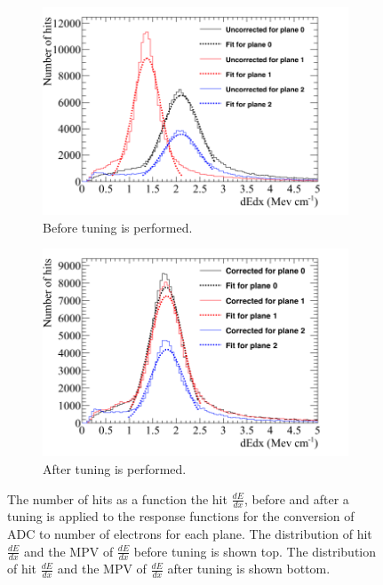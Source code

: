 \begin{figure}[h!]
  \centering
  \begin{subfigure}{0.6\textwidth}
    \centering
    \includegraphics[width=\textwidth]{UnCorrectedCanvas}
    \caption{Before tuning is performed.}
    \label{fig:CaloTune_Before}
  \end{subfigure}
  \begin{subfigure}{0.6\textwidth}
    \centering
    \includegraphics[width=\textwidth]{CorrectedCanvas}
    \caption{After tuning is performed.}
    \label{fig:CaloTune_After}
  \end{subfigure}
  \caption[The tuning of the calorimetric constants in the 35 ton]
          {The number of hits as a function the hit $\frac{dE}{dx}$, before and after a tuning is applied to the response functions for the conversion of ADC to number of electrons for each plane. The distribution of hit $\frac{dE}{dx}$ and the MPV of $\frac{dE}{dx}$ before tuning is shown top. The distribution of hit $\frac{dE}{dx}$ and the MPV of $\frac{dE}{dx}$ after tuning is shown bottom.}
          \label{fig:CaloTune}
\end{figure}
        
